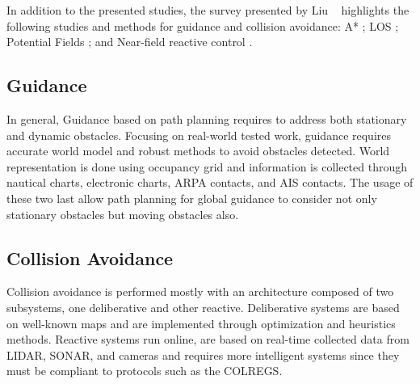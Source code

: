    In addition to the presented studies, the survey presented by Liu \etal~\cite{Liu2016Unmanned} highlights the following studies and methods for guidance and collision avoidance: 
    A* \cite{Svec2011Trajectory, Svec2012USV}; 
    \ac{LOS} \cite{Breivik2008Straight, Caccia2008Basic, Caccia2005Sampling, Desa2007Small, Fredriksen2006Global, Naeem2012Integrated, Peng2013Adaptive, Sharma2013Genetic, Xu2007Multi};
    Potential Fields \cite{Healey2007Collaborative, Soltan2009Trajectory}; and
    Near-field reactive control \cite{Larson2007Advances}.
    
    \subsection{Guidance}
    In general, Guidance based on path planning requires to address both stationary and dynamic obstacles. Focusing on real-world tested work, guidance requires accurate world model and robust methods to avoid obstacles detected. World representation is done using occupancy grid and information is collected through nautical charts, electronic charts, \ac{ARPA} contacts, and \ac{AIS} contacts. The usage of these two last allow path planning for global guidance to consider not only stationary obstacles but moving obstacles also.
    
    \subsection{Collision Avoidance}
    Collision avoidance is performed mostly with an architecture composed of two subsystems, one deliberative and other reactive. Deliberative systems are based on well-known maps and are implemented through optimization and heuristics methods. Reactive systems run online, are based on real-time collected data from \ac{LIDAR}, \ac{SONAR}, and cameras and requires more intelligent systems since they must be compliant to protocols such as the \ac{COLREGS}.
    
